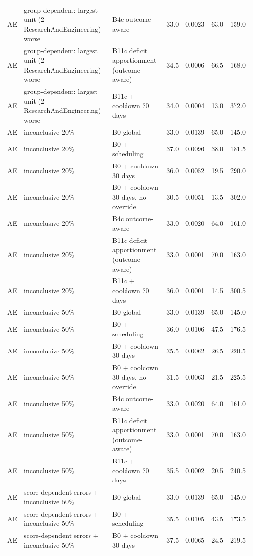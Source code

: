 \documentclass[10pt,onecolumn,letterpaper]{article}
\begin{document}
\begin{longtable}{lp{5.2cm}p{4.4cm}cccc}
AE & group-dependent: largest unit (2 - ResearchAndEngineering) worse & B4c outcome-aware & 33.0 & 0.0023 & 63.0 & 159.0 \\
AE & group-dependent: largest unit (2 - ResearchAndEngineering) worse & B11c deficit apportionment (outcome-aware) & 34.5 & 0.0006 & 66.5 & 168.0 \\
AE & group-dependent: largest unit (2 - ResearchAndEngineering) worse & B11c + cooldown 30 days & 34.0 & 0.0004 & 13.0 & 372.0 \\
AE & inconclusive 20\% & B0 global & 33.0 & 0.0139 & 65.0 & 145.0 \\
AE & inconclusive 20\% & B0 + scheduling & 37.0 & 0.0096 & 38.0 & 181.5 \\
AE & inconclusive 20\% & B0 + cooldown 30 days & 36.0 & 0.0052 & 19.5 & 290.0 \\
AE & inconclusive 20\% & B0 + cooldown 30 days, no override & 30.5 & 0.0051 & 13.5 & 302.0 \\
AE & inconclusive 20\% & B4c outcome-aware & 33.0 & 0.0020 & 64.0 & 161.0 \\
AE & inconclusive 20\% & B11c deficit apportionment (outcome-aware) & 33.0 & 0.0001 & 70.0 & 163.0 \\
AE & inconclusive 20\% & B11c + cooldown 30 days & 36.0 & 0.0001 & 14.5 & 300.5 \\
AE & inconclusive 50\% & B0 global & 33.0 & 0.0139 & 65.0 & 145.0 \\
AE & inconclusive 50\% & B0 + scheduling & 36.0 & 0.0106 & 47.5 & 176.5 \\
AE & inconclusive 50\% & B0 + cooldown 30 days & 35.5 & 0.0062 & 26.5 & 220.5 \\
AE & inconclusive 50\% & B0 + cooldown 30 days, no override & 31.5 & 0.0063 & 21.5 & 225.5 \\
AE & inconclusive 50\% & B4c outcome-aware & 33.0 & 0.0020 & 64.0 & 161.0 \\
AE & inconclusive 50\% & B11c deficit apportionment (outcome-aware) & 33.0 & 0.0001 & 70.0 & 163.0 \\
AE & inconclusive 50\% & B11c + cooldown 30 days & 35.5 & 0.0002 & 20.5 & 240.5 \\
AE & score-dependent errors + inconclusive 50\% & B0 global & 33.0 & 0.0139 & 65.0 & 145.0 \\
AE & score-dependent errors + inconclusive 50\% & B0 + scheduling & 35.5 & 0.0105 & 43.5 & 173.5 \\
AE & score-dependent errors + inconclusive 50\% & B0 + cooldown 30 days & 37.5 & 0.0065 & 24.5 & 219.5 \\

\end{longtable}
\end{document}
